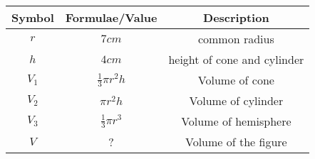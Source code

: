 
\begin{tabular}{|c|c|c|}
\hline
 Symbol & Formulae/Value & Description \\
\hline
 $r$  & $7cm$  & common radius  \\
 \hline
 $h$  & $4cm$  & height of cone and cylinder  \\
\hline
$V_1$ & $\frac{1}{3} \pi r^2 h$ & Volume of cone\\
\hline
$V_2$ & $\pi r^2 h$ & Volume of cylinder\\
\hline
$V_3$ & $\frac{1}{3} \pi r^3$ & Volume of hemisphere\\
\hline
$V$ & ? & Volume of the figure\\
\hline
\end{tabular}